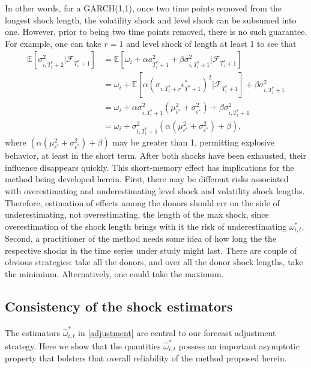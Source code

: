 \documentclass{uiucthesis2021}
\theoremstyle{definition}
\begin{document}
In other words, for a GARCH(1,1), once two time points removed from the longest shock length, the volatility shock and level shock can be subsumed into one.  However, prior to being two time points removed, there is no such guarantee.  For example, one can take $r = 1$ and level shock of length at least 1 to see that 
\begin{align*}
\mathbb{E}[ \sigma^{2}_{i,T_{i}^{*}+2} |\mathcal{F}_{T_{i}^{*}+1}] & = \mathbb{E}[\omega_{i} + \alpha a_{T_{i}^{*}+1}^{2} + \beta\sigma^{2}_{i,T_{i}^{*}+1} |\mathcal{F}_{T_{i}^{*}+1}] \\
& = \omega_{i} + \mathbb{E}[\alpha(\sigma_{i,T_{i}^{*}+r}\epsilon^{*}_{T^{*}+1})^{2} |\mathcal{F}_{T_{i}^{*}+1}] + \beta\sigma^{2}_{i,T_{i}^{*}+1} \\
& = \omega_{i} + \alpha\sigma^{2}_{i,T_{i}^{*}+1}(\mu^{2}_{\epsilon^{*}} + \sigma^{2}_{\epsilon^{*}}) + \beta\sigma^{2}_{i,T_{i}^{*}+1} \\
& = \omega_{i} + \sigma^{2}_{i,T_{i}^{*}+1}(\alpha(\mu^{2}_{\epsilon^{*}} + \sigma^{2}_{\epsilon^{*}}) + \beta)\text{,}
\end{align*}
where $(\alpha(\mu^{2}_{\epsilon^{*}} + \sigma^{2}_{\epsilon^{*}}) + \beta)$ may be greater than 1, permitting explosive behavior, at least in the short term.  After both shocks have been exhausted, their influence disappears quickly.  This short-memory effect has implications for the method being developed herein.  First, there may be different risks associated with overestimating and underestimating level shock and volatility shock lengths.  Therefore, estimation of effects among the donors should err on the side of underestimating, not overestimating, the length of the max shock, since overestimation of the shock length brings with it the risk of underestimating $\omega^{*}_{i,t}$.  Second, a practitioner of the method needs some idea of how long the the respective shocks in the time series under study might last.  There are couple of obvious strategies: take all the donors, and over all the donor shock lengths, take the minimium.  Alternatively, one could take the maximum.

\subsection{Consistency of the shock estimators}

The estimators $\hat\omega^{*}_{i,t}$ in \eqref{adjustment} are central to our forecast adjustment strategy.  Here we show that the quantities $\hat\omega^{*}_{i,t}$ possess an important asymptotic property that bolsters that overall reliability of the method proposed herein.
\end{document}
